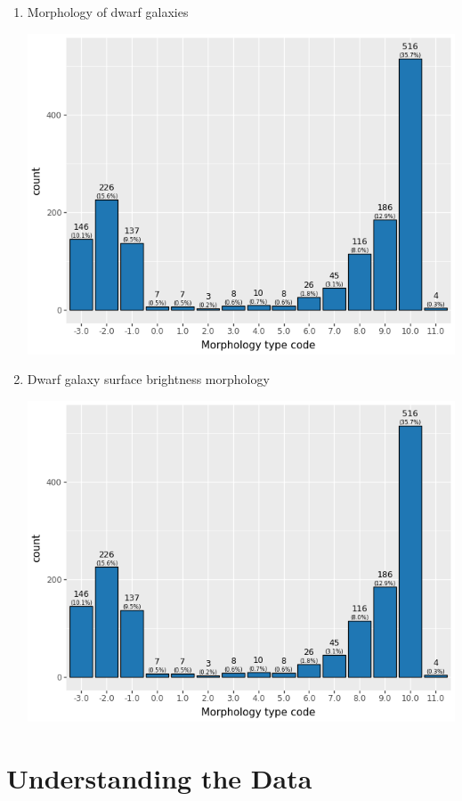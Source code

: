 \documentclass[a4paper]{article}
\begin{document}
\begin{enumerate}
\item Morphology of dwarf galaxies
\label{sec:org9759d71}


\begin{center}
\includegraphics[width=.9\linewidth]{./figure/Types.png}
\end{center}



\item Dwarf galaxy surface brightness morphology
\label{sec:org80a0b66}

\begin{center}
\includegraphics[width=.9\linewidth]{./figure/Types.png}
\end{center}
\end{enumerate}


\section{Understanding the Data}
\label{sec:org7cd3cde}
\end{document}
